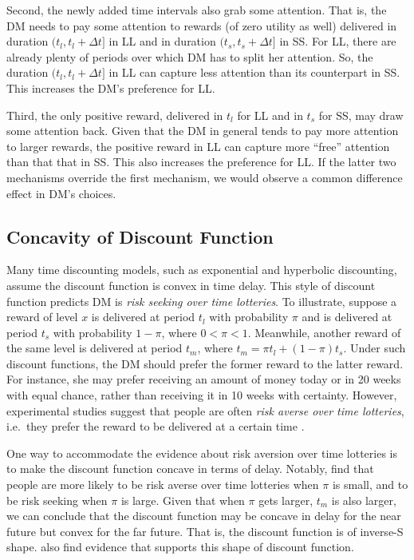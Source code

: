 \documentclass[
  12pt,
]{article}
\begin{document}
Second, the newly added time intervals also grab some attention. That
is, the DM needs to pay some attention to rewards (of zero utility as
well) delivered in duration \((t_l,t_l+\Delta t]\) in LL and in duration
\((t_s, t_s+\Delta t]\) in SS. For LL, there are already plenty of
periods over which DM has to split her attention. So, the duration
\((t_l,t_l+\Delta t]\) in LL can capture less attention than its
counterpart in SS. This increases the DM's preference for LL.

Third, the only positive reward, delivered in \(t_l\) for LL and in
\(t_s\) for SS, may draw some attention back. Given that the DM in
general tends to pay more attention to larger rewards, the positive
reward in LL can capture more ``free'' attention than that that in SS.
This also increases the preference for LL. If the latter two mechanisms
override the first mechanism, we would observe a common difference
effect in DM's choices.

\hypertarget{concavity-of-discount-function}{%
\subsection{Concavity of Discount
Function}\label{concavity-of-discount-function}}

Many time discounting models, such as exponential and hyperbolic
discounting, assume the discount function is convex in time delay. This
style of discount function predicts DM is \emph{risk seeking over time
lotteries}. To illustrate, suppose a reward of level \(x\) is delivered
at period \(t_l\) with probability \(\pi\) and is delivered at period
\(t_s\) with probability \(1-\pi\), where \(0<\pi<1\). Meanwhile,
another reward of the same level is delivered at period \(t_m\), where
\(t_m=\pi t_l +(1-\pi) t_s\). Under such discount functions, the DM
should prefer the former reward to the latter reward. For instance, she
may prefer receiving an amount of money today or in 20 weeks with equal
chance, rather than receiving it in 10 weeks with certainty. However,
experimental studies suggest that people are often \emph{risk averse
over time lotteries}, i.e.~they prefer the reward to be delivered at a
certain time \citep{onay2007intertemporal, dejarnette2020time}.

One way to accommodate the evidence about risk aversion over time
lotteries is to make the discount function concave in terms of delay.
Notably, \citet{onay2007intertemporal} find that people are more likely
to be risk averse over time lotteries when \(\pi\) is small, and to be
risk seeking when \(\pi\) is large. Given that when \(\pi\) gets larger,
\(t_m\) is also larger, we can conclude that the discount function may
be concave in delay for the near future but convex for the far future.
That is, the discount function is of inverse-S shape.
\citet{takeuchi2011non} also find evidence that supports this shape of
discount function.
\end{document}
